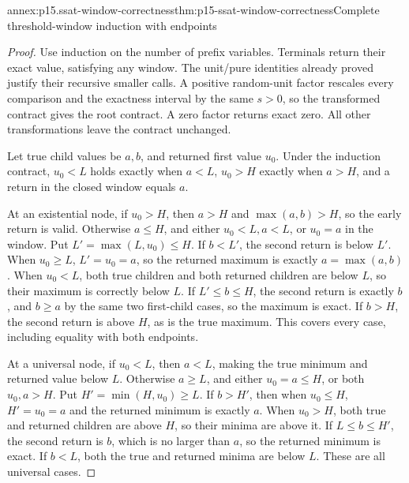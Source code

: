 \begin{annexitem}{annex:p15.ssat-window-correctness}{thm:p15-ssat-window-correctness}{Complete threshold-window induction with endpoints}
\begin{proof}
Use induction on the number of prefix variables. Terminals return
their exact value, satisfying any window. The unit/pure identities
already proved justify their recursive smaller calls. A positive
random-unit factor rescales every comparison and the exactness interval
by the same \(s>0\), so the transformed contract gives the root
contract. A zero factor returns exact zero. All other transformations
leave the contract unchanged.

Let true child values be \(a,b\), and returned first value \(u_0\).
Under the induction contract, \(u_0<L\) holds exactly when
\(a<L\), \(u_0>H\) exactly when \(a>H\), and a return
in the closed window equals \(a\).

At an existential node, if \(u_0>H\), then \(a>H\) and
\(\max(a,b)>H\), so the early return is valid. Otherwise
\(a\leq H\), and either \(u_0<L,a<L\), or \(u_0=a\)
in the window. Put \(L'=\max(L,u_0)\leq H\). If
\(b<L'\), the second return is below \(L'\). When
\(u_0\geq L\), \(L'=u_0=a\), so the returned maximum
is exactly \(a=\max(a,b)\). When \(u_0<L\), both true
children and both returned children are below \(L\), so their
maximum is correctly below \(L\). If \(L'\leq b\leq H\),
the second return is exactly \(b\), and \(b\geq a\) by
the same two first-child cases, so the maximum is exact. If
\(b>H\), the second return is above \(H\), as is the true
maximum. This covers every case, including equality with both endpoints.

At a universal node, if \(u_0<L\), then \(a<L\), making
the true minimum and returned value below \(L\). Otherwise
\(a\geq L\), and either \(u_0=a\leq H\), or both
\(u_0,a>H\). Put \(H'=\min(H,u_0)\geq L\). If
\(b>H'\), then when \(u_0\leq H\), \(H'=u_0=a\)
and the returned minimum is exactly \(a\). When \(u_0>H\),
both true and returned children are above \(H\), so their minima
are above it. If \(L\leq b\leq H'\), the second return is
\(b\), which is no larger than \(a\), so the returned minimum
is exact. If \(b<L\), both the true and returned minima are
below \(L\). These are all universal cases.


\end{proof}
\end{annexitem}
